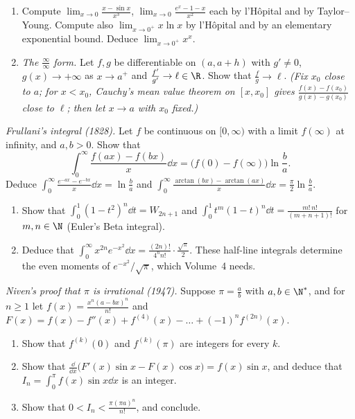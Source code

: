 \begin{exercise}[$\star\star$]\label{ex:lhopital}
\begin{enumerate}[label=(\alph*)]
\item Compute $\lim_{x\to0}\frac{x-\sin x}{x^3}$, $\lim_{x\to0}\frac{e^x-1-x}{x^2}$ each by l'H\^opital and by Taylor--Young. Compute also
$\lim_{x\to0^+}x\ln x$ by l'H\^opital and by an elementary exponential bound. Deduce $\lim_{x\to0^+}x^x$.
\item \emph{The $\frac\infty\infty$ form.} Let $f,g$ be differentiable on $(a,a+h)$ with $g'\ne0$, $g(x)\to+\infty$ as $x\to a^+$ and $\frac{f'}{g'}\to\ell\in\R$. Show that $\frac fg\to\ell$. \emph{(Fix $x_0$ close to $a$; for $x<x_0$, Cauchy's mean value theorem on $[x,x_0]$ gives $\frac{f(x)-f(x_0)}{g(x)-g(x_0)}$ close to $\ell$; then let $x\to a$ with $x_0$ fixed.)}
\end{enumerate}
\end{exercise}

\begin{exercise}[$\star\star$]\label{ex:frullani}
\emph{Frullani's integral (1828).} Let $f$ be continuous on $[0,\infty)$ with a limit $f(\infty)$ at infinity, and $a,b>0$. Show that
\[
\int_0^\infty\frac{f(ax)-f(bx)}x\dd x=\bigl(f(0)-f(\infty)\bigr)\ln\frac ba.
\]
Deduce $\int_0^\infty\frac{e^{-ax}-e^{-bx}}x\dd x=\ln\frac ba$ and $\int_0^\infty\frac{\arctan(bx)-\arctan(ax)}{x}\dd x=\frac\pi2\ln\frac ba$.
\end{exercise}

\begin{exercise}[$\star\star$]\label{ex:gammahalf}
\begin{enumerate}[label=(\alph*)]
\item Show that $\displaystyle\int_0^1(1-t^2)^n\dd t=W_{2n+1}$ and $\displaystyle\int_0^1t^{m}(1-t)^{n}\dd t=\frac{m!\,n!}{(m+n+1)!}$ for $m,n\in\N$ (Euler's Beta integral).
\item Deduce that $\displaystyle\int_0^\infty x^{2n}e^{-x^2}\dd x=\frac{(2n)!}{4^nn!}\cdot\frac{\sqrt\pi}2$. These half-line integrals determine the even moments of $e^{-x^2}/\sqrt\pi$, which Volume~4 needs.
\end{enumerate}
\end{exercise}

\begin{exercise}[$\star\star\star$]\label{ex:niven}
\emph{Niven's proof that $\pi$ is irrational (1947).} Suppose $\pi=\frac ab$ with $a,b\in\N^*$, and for $n\ge1$ let $f(x)=\frac{x^n(a-bx)^n}{n!}$ and $F(x)=f(x)-f''(x)+f^{(4)}(x)-\dots+(-1)^nf^{(2n)}(x)$.
\begin{enumerate}[label=(\alph*)]
\item Show that $f^{(k)}(0)$ and $f^{(k)}(\pi)$ are integers for every $k$.
\item Show that $\frac{\dd}{\dd x}\bigl(F'(x)\sin x-F(x)\cos x\bigr)=f(x)\sin x$, and deduce that $I_n=\int_0^\pi f(x)\sin x\dd x$ is an integer.
\item Show that $0<I_n<\frac{\pi(\pi a)^n}{n!}$, and conclude.
\end{enumerate}
\end{exercise}

